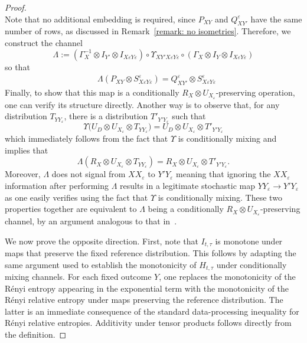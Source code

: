 \documentclass[aps,pra,11pt,onecolumn,nofootinbib,tightenlines]{revtex4-2}
\theoremstyle{definition}
\begin{document}
\begin{proof}
\begin{equation}
\end{equation}
Note that no additional embedding is required, since $P_{XY}$ and $Q^\varepsilon_{XY'}$ have the same number of rows, as discussed in Remark~\ref{remark: no isometries}.
Therefore, we construct the channel
\begin{equation}
	\Lambda := (\Gamma^{-1}_X \otimes I_{Y'}\otimes I_{X\varepsilon Y\varepsilon}) \circ \Upsilon_{XY'X\varepsilon Y\varepsilon} \circ (\Gamma_X \otimes I_{Y}\otimes I_{X\varepsilon Y\varepsilon})
\end{equation}
so that
\begin{align}
	&\Lambda (P_{XY} \otimes S^\varepsilon_{X\varepsilon Y\varepsilon})  = Q^\varepsilon_{XY'} \otimes S^\varepsilon_{X\varepsilon Y\varepsilon}%
\end{align}
Finally, to show that this map is a conditionally $R_X\otimes U_{X_\varepsilon}$-preserving operation, one can verify its structure directly. Another way is to observe that, for any distribution $T_{YY_\varepsilon}$, there is a distribution $T'_{Y'Y_\varepsilon}$ such that
\begin{equation}
\Upsilon\big(U_D\otimes U_{X_\varepsilon}\otimes T_{YY_\varepsilon}\big)=U_D\otimes U_{X_\varepsilon}\otimes T'_{Y'Y_\varepsilon}
\end{equation}
which immediately follows from the fact that $\Upsilon$ is conditionally mixing and implies that
\begin{equation}
\Lambda(R_{X}\otimes U_{X_\varepsilon}\otimes T_{YY_\varepsilon})=R_X\otimes U_{X_\varepsilon
}\otimes T'_{Y'Y_\varepsilon}.
\end{equation}
Moreover, $\Lambda$ does not signal from $XX_\varepsilon$ to $Y'Y_\varepsilon$ meaning that ignoring the $XX_\varepsilon$ information after performing $\Lambda$ results in a legitimate stochastic map $YY_\varepsilon\to Y'Y_\varepsilon$ as one easily verifies using the fact that $\Upsilon$ is conditionally mixing. These two properties together are equivalent to $\Lambda$ being a conditionally $R_X\otimes U_{X_\varepsilon}$-preserving channel, by an argument analogous to that in~\cite[Section C]{gour2024inevitability}. 





We now prove the opposite direction. First, note that $I_{t,\tau}$ is monotone under maps that preserve the fixed reference distribution. This follows by adapting the same argument used to establish the monotonicity of $H_{t,\tau}$ under conditionally mixing channels. For each fixed outcome $Y$, one replaces the monotonicity of the Rényi entropy appearing in the exponential term with the monotonicity of the Rényi relative entropy under maps preserving the reference distribution. The latter is an immediate consequence of the standard data-processing inequality for R\'enyi relative entropies. Additivity under tensor products follows directly from the definition.


\end{proof}
\end{document}
